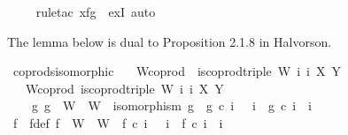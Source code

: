 \begin{isabellebody}
\ \ \ \ \isamarkupfalse%
{\isacharparenleft}{\kern0pt}rule{\isacharunderscore}{\kern0pt}tac\ x{\isacharequal}{\kern0pt}{\isachardoublequoteopen}f{\isasymamalg}g{\isachardoublequoteclose}\ \ exI{\isacharcomma}{\kern0pt}\ auto{\isacharparenright}{\kern0pt}\isanewline
{}\isamarkupfalse%
%
\endisatagproof
{\isafoldproof}%
%
\isadelimproof
%
\endisadelimproof
%
\begin{isamarkuptext}%
The lemma below is dual to Proposition 2.1.8 in Halvorson.%
\end{isamarkuptext}\isamarkuptrue%
\isamarkupfalse%
\ coprods{\isacharunderscore}{\kern0pt}isomorphic{\isacharcolon}{\kern0pt}\isanewline
\ \ \ W{\isacharunderscore}{\kern0pt}coprod{\isacharcolon}{\kern0pt}\ \ {\isachardoublequoteopen}is{\isacharunderscore}{\kern0pt}coprod{\isacharunderscore}{\kern0pt}triple\ {\isacharparenleft}{\kern0pt}W{\isacharcomma}{\kern0pt}\ i\ i\ X\ Y{\isachardoublequoteclose}\isanewline
\ \ \ W{\isacharprime}{\kern0pt}{\isacharunderscore}{\kern0pt}coprod{\isacharcolon}{\kern0pt}\ {\isachardoublequoteopen}is{\isacharunderscore}{\kern0pt}coprod{\isacharunderscore}{\kern0pt}triple\ {\isacharparenleft}{\kern0pt}W{\isacharprime}{\kern0pt}{\isacharcomma}{\kern0pt}\ i{\isacharprime}{\kern0pt}\ i{\isacharprime}{\kern0pt}\ X\ Y{\isachardoublequoteclose}\isanewline
\ \ \ {\isachardoublequoteopen}{\isasymexists}\ g{\isachardot}{\kern0pt}\ g\ {\isacharcolon}{\kern0pt}\ W\ {\isasymrightarrow}\ W{\isacharprime}{\kern0pt}\ {\isasymand}\ isomorphism\ g\ {\isasymand}\ g\ {\isasymcirc}\isactrlsub c\ i\ \ {\isacharequal}{\kern0pt}\ i{\isacharprime}{\kern0pt}\ {\isasymand}\ g\ {\isasymcirc}\isactrlsub c\ i\ {\isacharequal}{\kern0pt}\ i{\isacharprime}{\kern0pt}\isanewline
%
\isadelimproof
%
\endisadelimproof
%
\isatagproof
{}\isamarkupfalse%
\ {\isacharminus}{\kern0pt}\isanewline
\ \ \isamarkupfalse%
\ f\ \ f{\isacharunderscore}{\kern0pt}def{\isacharcolon}{\kern0pt}\ {\isachardoublequoteopen}f\ {\isacharcolon}{\kern0pt}\ W{\isacharprime}{\kern0pt}\ {\isasymrightarrow}\ W\ {\isasymand}\ f\ {\isasymcirc}\isactrlsub c\ i{\isacharprime}{\kern0pt}\ \ {\isacharequal}{\kern0pt}\ i\ {\isasymand}\ f\ {\isasymcirc}\isactrlsub c\ i{\isacharprime}{\kern0pt}\ {\isacharequal}{\kern0pt}\ i\isanewline

\end{isabellebody}
